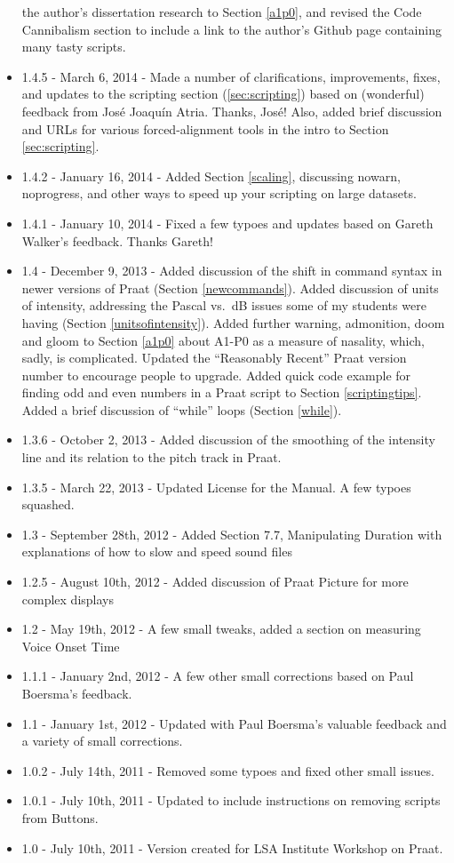 \documentclass[11pt]{article}
\begin{document}
\begin{itemize}
  the author's dissertation research to Section \ref{a1p0}, and revised
  the Code Cannibalism section to include a link to the author's Github
  page containing many tasty scripts.
\item
  1.4.5 - March 6, 2014 - Made a number of clarifications, improvements,
  fixes, and updates to the scripting section (\ref{sec:scripting})
  based on (wonderful) feedback from José Joaquín Atria. Thanks, José!
  Also, added brief discussion and URLs for various forced-alignment
  tools in the intro to Section \ref{sec:scripting}.
\item
  1.4.2 - January 16, 2014 - Added Section \ref{scaling}, discussing
  nowarn, noprogress, and other ways to speed up your scripting on large
  datasets.
\item
  1.4.1 - January 10, 2014 - Fixed a few typoes and updates based on
  Gareth Walker's feedback. Thanks Gareth!
\item
  1.4 - December 9, 2013 - Added discussion of the shift in command
  syntax in newer versions of Praat (Section \ref{newcommands}). Added
  discussion of units of intensity, addressing the Pascal vs.~dB issues
  some of my students were having (Section \ref{unitsofintensity}).
  Added further warning, admonition, doom and gloom to Section
  \ref{a1p0} about A1-P0 as a measure of nasality, which, sadly, is
  complicated. Updated the ``Reasonably Recent'' Praat version number to
  encourage people to upgrade. Added quick code example for finding odd
  and even numbers in a Praat script to Section \ref{scriptingtips}.
  Added a brief discussion of ``while'' loops (Section \ref{while}).
\item
  1.3.6 - October 2, 2013 - Added discussion of the smoothing of the
  intensity line and its relation to the pitch track in Praat.
\item
  1.3.5 - March 22, 2013 - Updated License for the Manual. A few typoes
  squashed.
\item
  1.3 - September 28th, 2012 - Added Section 7.7, Manipulating Duration
  with explanations of how to slow and speed sound files
\item
  1.2.5 - August 10th, 2012 - Added discussion of Praat Picture for more
  complex displays
\item
  1.2 - May 19th, 2012 - A few small tweaks, added a section on
  measuring Voice Onset Time
\item
  1.1.1 - January 2nd, 2012 - A few other small corrections based on
  Paul Boersma's feedback.
\item
  1.1 - January 1st, 2012 - Updated with Paul Boersma's valuable
  feedback and a variety of small corrections.
\item
  1.0.2 - July 14th, 2011 - Removed some typoes and fixed other small
  issues.
\item
  1.0.1 - July 10th, 2011 - Updated to include instructions on removing
  scripts from Buttons.
\item
  1.0 - July 10th, 2011 - Version created for LSA Institute Workshop on
  Praat.
\end{itemize}
\end{document}
